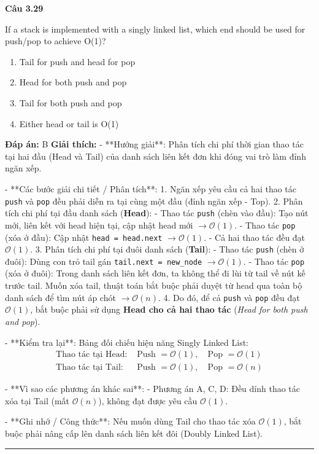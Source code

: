 \documentclass[11pt,a4paper]{article}
\newenvironment{question}[1]{%
  \par\vspace{1em}\noindent\textbf{\large Câu #1}\par\vspace{0.4em}
}{%
  \par\vspace{1em}\hrule\vspace{0.6em}
}
\newenvironment{choices}{%
  \begin{enumerate}[label=\textbf{\Alph*.},leftmargin=2.2em,itemsep=2pt,topsep=3pt]
}{%
  \end{enumerate}
}
\newcommand{\choice}{\item}
\begin{document}
\begin{question}{3.29}
If a stack is implemented with a singly linked list, which end should be used for push/pop to achieve O(1)?
\begin{choices}
\choice Tail for push and head for pop
\choice Head for both push and pop
\choice Tail for both push and pop
\choice Either head or tail is O(1)
\end{choices}
\textbf{Đáp án:} B
\textbf{Giải thích:} - **Hướng giải**:
Phân tích chi phí thời gian thao tác tại hai đầu (Head và Tail) của danh sách liên kết đơn khi đóng vai trò làm đỉnh ngăn xếp.


- **Các bước giải chi tiết / Phân tích**:
1. Ngăn xếp yêu cầu cả hai thao tác \texttt{push} và \texttt{pop} đều phải diễn ra tại cùng một đầu (đỉnh ngăn xếp - Top).
2. Phân tích chi phí tại đầu danh sách (\textbf{Head}):
   - Thao tác \texttt{push} (chèn vào đầu): Tạo nút mới, liên kết với head hiện tại, cập nhật head mới \(\rightarrow \mathcal{O}(1)\).
   - Thao tác \texttt{pop} (xóa ở đầu): Cập nhật \texttt{head = head.next} \(\rightarrow \mathcal{O}(1)\).
   - Cả hai thao tác đều đạt \(\mathcal{O}(1)\).
3. Phân tích chi phí tại đuôi danh sách (\textbf{Tail}):
   - Thao tác \texttt{push} (chèn ở đuôi): Dùng con trỏ tail gán \texttt{tail.next = new\_node} \(\rightarrow \mathcal{O}(1)\).
   - Thao tác \texttt{pop} (xóa ở đuôi): Trong danh sách liên kết đơn, ta không thể đi lùi từ tail về nút kế trước tail. Muốn xóa tail, thuật toán bắt buộc phải duyệt từ head qua toàn bộ danh sách để tìm nút áp chót \(\rightarrow \mathcal{O}(n)\).
4. Do đó, để cả \texttt{push} và \texttt{pop} đều đạt \(\mathcal{O}(1)\), bắt buộc phải sử dụng \textbf{Head cho cả hai thao tác} (\textit{Head for both push and pop}).


- **Kiểm tra lại**:
Bảng đối chiếu hiệu năng Singly Linked List:
\[\begin{aligned}
\text{Thao tác tại Head: } & \text{Push } = \mathcal{O}(1), \quad \text{Pop } = \mathcal{O}(1) \\
\text{Thao tác tại Tail: } & \text{Push } = \mathcal{O}(1), \quad \text{Pop } = \mathcal{O}(n)
\end{aligned}\]


- **Vì sao các phương án khác sai**:
- Phương án A, C, D: Đều dính thao tác xóa tại Tail (mất \(\mathcal{O}(n)\)), không đạt được yêu cầu \(\mathcal{O}(1)\).


- **Ghi nhớ / Công thức**:
Nếu muốn dùng Tail cho thao tác xóa \(\mathcal{O}(1)\), bắt buộc phải nâng cấp lên danh sách liên kết đôi (Doubly Linked List).
\end{question}
\end{document}
